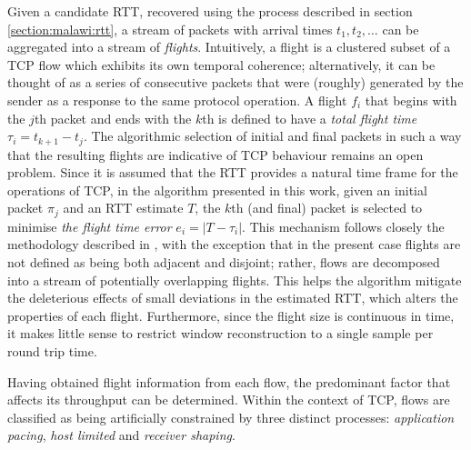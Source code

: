 Given a candidate \ac{RTT}, recovered using the process described in section \ref{section:malawi:rtt}, a stream of packets with arrival times $t_1, t_2, \ldots$ can be aggregated into a stream of \emph{flights}. 
Intuitively, a flight is a clustered subset of a \ac{TCP} flow which exhibits its own temporal coherence; alternatively, it can be thought of as a series of consecutive packets that were (roughly) generated by the sender as a response to the same protocol operation. 
A flight $f_i$ that begins with the $j$th packet and ends with the $k$th is defined to have a \emph{total flight time} $\tau_i = t_{k+1} - t_j$. 
The algorithmic selection of initial and final packets in such a way that the resulting flights are indicative of \ac{TCP} behaviour remains an open problem. 
Since it is assumed that the \ac{RTT} provides a natural time frame for the operations of \ac{TCP}, in the algorithm presented in this work, given an initial packet $\pi_j$ and an \ac{RTT} estimate $T$, the $k$th (and final) packet is selected to minimise \emph{the flight time error} $e_i = |T - \tau_i|$. 
This mechanism follows closely the methodology described in \cite{Zhang:2002p85}, with the exception that in the present case flights are not defined as being both adjacent and disjoint; rather, flows are decomposed into a stream of potentially overlapping flights. 
This helps the algorithm mitigate the deleterious effects of small deviations in the estimated \ac{RTT}, which alters the properties of each flight. 
Furthermore, since the flight size is continuous in time, it makes little sense to restrict window reconstruction to a single sample per round trip time.

Having obtained flight information from each flow, the predominant factor that affects its throughput can be determined.
Within the context of \ac{TCP}, flows are classified as being artificially constrained by three distinct processes: \emph{application pacing}, \emph{host limited} and \emph{receiver shaping}.

